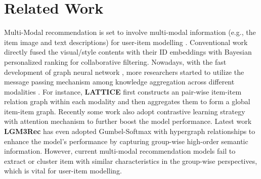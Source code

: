 \section{Related Work}
%
Multi-Modal recommendation is set to involve multi-modal information (e.g., the item image and text descriptions) for user-item modelling \cite{zhu2024multimodal,zhong2024mirror,liu2023multimodal,mu2022learning,tao2022self}.
%
Conventional work \cite{he2016vbpr,zhang2019deep,wei2019mmgcn} directly fused the visual/style contents with their ID embeddings with Bayesian personalized ranking \cite{bpr} for collaborative filtering.
%
Nowadays, with the fast development of graph neural network \cite{lightgcn}, more researchers started to utilize the message passing mechanism among knowledge aggregation across different modalities \cite{wei2019mmgcn,wang2021dualgnn,wei2020graph}.
%
For instance, \textbf{LATTICE} \cite{zhang2021mining} first constructs an pair-wise item-item relation graph within each modality and then aggregates them to form a global item-item graph.
%
Recently some work \cite{zhou2023bootstrap} also adopt contrastive learning strategy \cite{wang2022towards} with attention mechanism to further boost the model performance.
%
Latest work \textbf{LGM3Rec} \cite{guo2024lgmrec} has even adopted Gumbel-Softmax with hypergraph relationships to enhance the model's performance by capturing group-wise high-order semantic information.
%
However, current multi-modal recommendation models fail to extract or cluster item with similar characteristics in the group-wise perspectives, which is vital for user-item modelling.  






